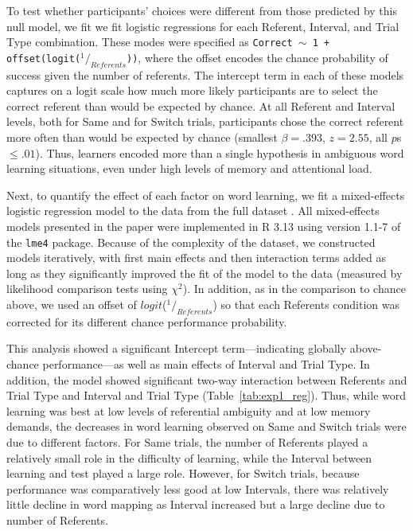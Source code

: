 \documentclass[man,floatsintext]{apa6}
\begin{document}
To test whether participants' choices were different from those predicted by this null model, we fit we fit logistic regressions for each Referent, Interval, and Trial Type combination. These modes were specified as \small{\tt{Correct $\sim$ 1 + offset(logit($^1/_{Referents}$))}}, where the offset encodes the chance probability of success given the number of referents. The intercept term in each of these models captures on a logit scale how much more likely participants are to select the correct referent than would be expected by chance. At all Referent and Interval levels, both for Same and for Switch trials, participants chose the correct referent more often than would be expected by chance (smallest $\beta =  .393$, $z=2.55$, all $p$s $\leq .01$). Thus, learners encoded more than a single hypothesis in ambiguous word learning situations, even under high levels of memory and attentional load. 

Next, to quantify the effect of each factor on word learning, we fit a mixed-effects logistic regression model to the data from the full dataset \cite{Baayen2008}. All mixed-effects models presented in the paper were implemented in R 3.13 using version 1.1-7 of the \texttt{lme4} package. Because of the complexity of the dataset, we constructed models iteratively, with first main effects and then interaction terms added as long as they significantly improved the fit of the model to the data (measured by likelihood comparison tests using $\chi^2$). In addition, as in the comparison to chance above, we used an offset of $logit$($^1/_{Referents}$) so that each Referents condition was corrected for its different chance performance probability. 

This analysis showed a significant Intercept term---indicating globally above-chance performance---as well as main effects of Interval and Trial Type. In addition, the model showed significant two-way interaction between Referents and Trial Type and Interval and Trial Type (Table~\ref{tab:exp1_reg}). Thus, while word learning was best at low levels of referential ambiguity and at low memory demands, the decreases in word learning observed on Same and Switch trials were due to different factors. For Same trials, the number of Referents played a relatively small role in the difficulty of learning, while the Interval between learning and test played a large role. However, for Switch trials, because performance was comparatively less good at low Intervals, there was relatively little decline in word mapping as Interval increased but a large decline due to number of Referents. 
\end{document}
